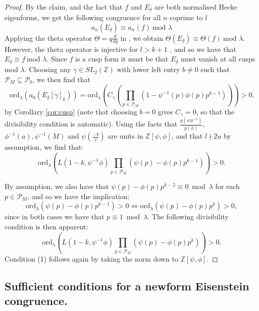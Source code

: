 \documentclass{amsart}
\theoremstyle{plain}
\theoremstyle{definition}
\newcommand*{\field}[1]{\mathbb{#1}}
\begin{document}
\begin{proof}
By the claim, and the fact that $f$ and $E_{\underline{\delta}}$ are both normalised Hecke eigenforms, we get the following congruence for all $n$ coprime to $l$
\begin{equation*}
    a_n(E_{\underline{\delta}}) \equiv a_n(f) \ \text{mod } \lambda
\end{equation*}
Applying the theta operator $\Theta = q\frac{d}{dq}$ in \cite{serre_2003}, we obtain $\Theta(E_{\underline{\delta}}) \equiv \Theta(f) \ \text{mod } \lambda$. However, the theta operator is injective for $l > k+1$ \cite[Corollary 3]{katz_1977}, and so we have that $E_{\underline{\delta}} \equiv f \ \text{mod } \lambda$. Since $f$ is a cusp form it must be that $E_{\underline{\delta}}$ must vanish at all cusps mod $\lambda$. Choosing any $\gamma \in SL_2(\field{Z})$ with lower left entry $b\neq 0$ such that $\mathcal{P}_M\subseteq \mathcal{P}_b$, we then find that 
\begin{equation*}
    \text{ord}_\lambda(a_0(E_{\underline{\delta}}[\gamma]_k)) = \text{ord}_\lambda\left(C_{\gamma}\left(\prod_{p \in \mathcal{P}_M} (1-\psi^{-1}(p)\phi(p)p^{k-1})\right)\right)>0.
\end{equation*} by Corollary \ref{cor:cusp} (note that choosing $b=0$ gives $C_{\gamma} = 0$, so that the divisibility condition is automatic).
Using the facts that $\frac{g(\psi\phi^{-1})}{g(\phi)}$, $\phi^{-1}(a), \psi^{-1}(M)$ and $\psi\left(\frac{-b}{v}\right)$ are units in $\field{Z}[\psi, \phi]$, and that $l \nmid 2u$ by assumption, we find that:
\begin{equation*}
    \text{ord}_{\lambda}\left(L(1-k, \psi^{-1}\phi)\prod_{p \in \mathcal{P}_M} (\psi(p)-\phi(p)p^{k-1})\right)>0.
\end{equation*}

\noindent By assumption, we also have that $\psi(p) - \phi(p)p^{k-2} \equiv 0 \bmod \lambda$ for each $p\in\mathcal{P}_M$, and so we have the implication: \[\text{ord}_{\lambda}(\psi(p)-\phi(p)p^{k-1}) > 0 \iff \text{ord}_{\lambda}(\psi(p)-\phi(p)p^k) > 0,\] since in both cases we have that $p\equiv 1 \bmod \lambda$. The following divisibility condition is then apparent:  \begin{equation*}
    \text{ord}_{\lambda}\left(L(1-k, \psi^{-1}\phi)\prod_{p \in \mathcal{P}_M} (\psi(p)-\phi(p)p^k)\right)>0.
\end{equation*}
Condition (1) follows again by taking the norm down to $\mathbb{Z}[\psi,\phi]$.
\end{proof}

\subsection{Sufficient conditions for a newform Eisenstein congruence.}
\end{document}

